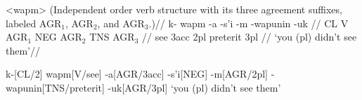 \ex[belowpreambleskip=0pt,aboveglftskip=0pt,aboveglbskip=0pt,
   aboveglcskip=0pt,everygla=,everyglb=,everyglc=,
   everyglft=]<wapm>
\begingl
\glpreamble (Independent order verb structure with its three
agreement suffixes, labeled {\sc AGR$_1$}, {\sc AGR$_2$}, and {\sc
AGR$_3$}.)//
\gla k- wapm -a -s'i -m -wapunin -uk //
\glb CL V AGR$_1$ NEG AGR$_2$ TNS AGR$_3$ //
 see {\sc 3acc} {} {\sc 2pl} preterit {\sc 3pl} //
\glft `you (pl) didn't see them'//
\endgl
\xe


\ex[glstyle=nlevel]
\begingl
k-[CL/2] wapm[V/see] -a[AGR/\sc 3acc] -s'i[NEG]
-m[AGR/\sc 2pl] -wapunin[TNS/preterit] -uk[AGR/\sc 3pl]
\glft `you (pl) didn't see them'
\endgl
\xe

\endinput

\ex[glstyle=nlevel,belowpreambleskip=0pt,aboveglftskip=0pt,
   aboveglbskip=0pt,   aboveglcskip=0pt,everygla=,everyglb=,
   everyglc=,everyglft=]<gln-wapm>
\begingl
\glpreamble
(Independent order verb structure with its three
agreement suffixes, labeled {\sc AGR$_1$}, {\sc AGR$_2$}, and {\sc
AGR$_3$}.)
\glilg
k-[CL/2] wapm[V/see] -a[AGR/\sc 3acc] -s'i[NEG]
-m[AGR/\sc 2pl] -wapunin[TNS/preterit] -uk[AGR/\sc 3pl]
\glft
`you (pl) didn't see them'
\endgl
\xe

\endinput


\makeatletter
\let\mergerow=\glw@mergerow
\resetatcatcode

\ex[everygla=]
\begingl
\gla a1 {\hfil b1} //
\glb a2 bbbb2 //
\showtoks\mainlist
\endgl\xe



\endinput





\newtoks\mytoks
\def\@showtoks{\@getoptionalarg\@showtoks@i}
\def\@showtoks@i #1{\mytoks=\expandafter{#1}\writeln{%
   \@optionalarg\the\mytoks}}
\let\showtoks=\@showtoks
\newcount\@itemtype
\def\@getitemtype #1{\expandafter\@getitemtype@i #1\@nil}
\def\@getitemtype@i #1#2\@nil{%
   \def\temp{#2}%
   \ifx\temp\empty
      \if\ep@samecharcode#1+\relax
         \@itemtype=1
      \else\if\ep@samecharcode#1@\relax
         \@itemtype=2
      \else\if\ep@samecharcode #1[\relax
         \@itemtype=3
      \else\if\ep@samecharcode #1]
         \@itemtype=4
      \else \@itemtype=0
         \fi\fi\fi\fi
   \else
      \ifx#1\nogloss \@itemtype=5
      \else \@itemtype=0 \fi
   \fi
}

\lingset{glhangindent=0pt,glstyle=wrap,glrightskip=0pt plus 1in,
   extraglskip=1ex,everygla=}

